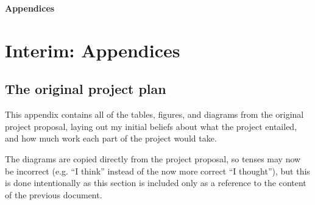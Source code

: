 \documentclass{article}
\begin{document}
\clearpage


\printglossaries

\nocite{osdev-wiki}
\nocite{unix-prog-env}
\printbibliography[heading=bibintoc]


































\clearpage
\appendix
{}
\newrefsection
{}
\renewcommand{\thesubsection}{\Alph{subsection}}
\renewcommand{\thesubsubsection}{\thesubsection.\alph{subsubsection}}

{\Large\bfseries Appendices\vspace{2ex}}

\section{Interim: Appendices}
\subsection{The original project plan}
This appendix contains all of the tables, figures, and diagrams from the
original project proposal, laying out my initial beliefs about what the project
entailed, and how much work each part of the project would take.

The diagrams are copied directly from the project proposal, so tenses may now
be incorrect (e.g. ``I think'' instead of the now more correct ``I thought''),
but this is done intentionally as this section is included only as a reference
to the content of the previous document.
\end{document}
